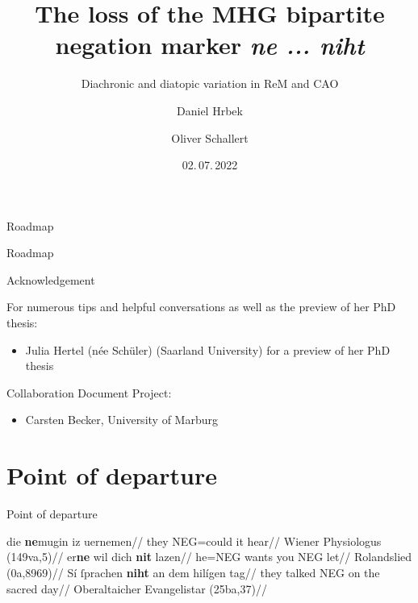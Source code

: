 \documentclass[xcolor=table, compress, %
handout
]{beamer}
\title[Loss of the MHG bipartite negation marker \textit{ne ... niht}]{\bf{The loss of the MHG bipartite negation marker \textit{ne ... niht}}}
\subtitle{Diachronic and diatopic variation in ReM and CAO}
\author[Daniel Hrbek and Oliver Schallert]{%
Daniel Hrbek\inst{1} \and Oliver Schallert\inst{2}}
\institute{%
\inst{1} Osnabrück University %

\href{mailto:daniel.hrbek@uni-osnabrueck.de}{\texttt{daniel.hrbek@uni-osnabrueck.de}}
\and
\inst{2} Ludwig Maximilian University of Munich %

\href{mailto:oliver.schallert@lmu.de}{\texttt{oliver.schallert@lmu.de}}
}
\date{02.\,07.\,2022
}
\begin{document}
\begin{frame}
\titlepage
\end{frame}



\begin{frame}{Roadmap}

\tableofcontents[sections={1-2}]

\end{frame}

\begin{frame}{Roadmap}

\tableofcontents[sections={3-5}]


\end{frame}

\begin{frame}{Acknowledgement}

For numerous tips and helpful conversations as well as the preview of her PhD thesis:

\begin{itemize}
\item \alert{Julia Hertel} (née Schüler) (Saarland University) for a preview of her PhD thesis
\end{itemize}
\bigskip

Collaboration Document Project:
\begin{itemize}
\item \alert{Carsten Becker,} University of Marburg
\end{itemize}

\end{frame}


\section{Point of departure}

\begin{frame}{Point of departure}

\pex[interpartskip=1ex] \label{a}
\a
\begingl
\gla die \textbf{ne}mugin iz uernemen//
\glb they NEG=could it hear//
\glft Wiener Physiologus (149va,5)//
\endgl
\a
\begingl
\gla er\textbf{ne} wil dich \textbf{nit} lazen//
\glb he=NEG wants you NEG let//
\glft Rolandslied (0a,8969)//
\endgl
\a
\begingl
\gla Sí	ſprachen \textbf{niht} an dem hilígen tag//
\glb they talked NEG on the sacred day//
\glft  Oberaltaicher Evangelistar (25ba,37)//
\endgl
\xe

\end{frame}
\end{document}
